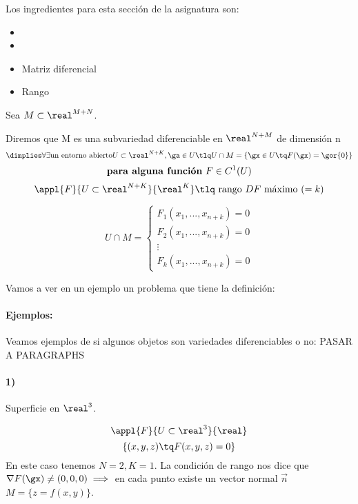   Los ingredientes para esta sección de la asignatura son:
  \begin{itemize}
    \item
    \item
   \item Matriz diferencial
   \item Rango
  \end{itemize}

  
  \begin{defn}
  Sea $M \subset \real^{M+N}$.
  
  Diremos que M es una subvariedad diferenciable en $\real^{N+M}$ de dimensión n \[\dimplies \forall \exists \text{un entorno abierto} U \subset \real^{N+K}, \ga \in U \tlq U\cap M = \{\gx\in U\tq F(\gx) = \gor{0}\} \]\[\text{\textbf{para alguna función} } F\in C^1(U)\]
  \[\appl{F}{U\subset \real^{N+K}}{\real^K} \tlq \text{ rango } DF \text{ máximo } (=k)\]
  
  \[U\cap M = \left\{\begin{array}{cc}
                     F_1(x_1,...,x_{n+k}) = 0\\
                     F_2(x_1,...,x_{n+k}) = 0\\
                     \vdots\\
                     F_k(x_1,...,x_{n+k}) = 0
                    \end{array}\right.\] 
  \end{defn}

  Vamos a ver en un ejemplo un problema que tiene la definición:
  
  \paragraph{Ejemplos:}



Veamos ejemplos de si algunos objetos son variedades diferenciables o no:
PASAR A PARAGRAPHS

\paragraph{1)}
  Superficie en $\real^3$.
  
  \[\appl{F}{U\subset\real^3}{\real}\]
  \[\{(x,y,z) \tq F(x,y,z) = 0\}\]
  En este caso tenemos $N=2, K=1$.
  La condición de rango nos dice que $\nabla F(\gx) \neq (0,0,0) \implies $ en cada punto existe un vector normal $\overrightarrow{n}$
  \obs $M = \{z = f(x,y)\}$.
  
